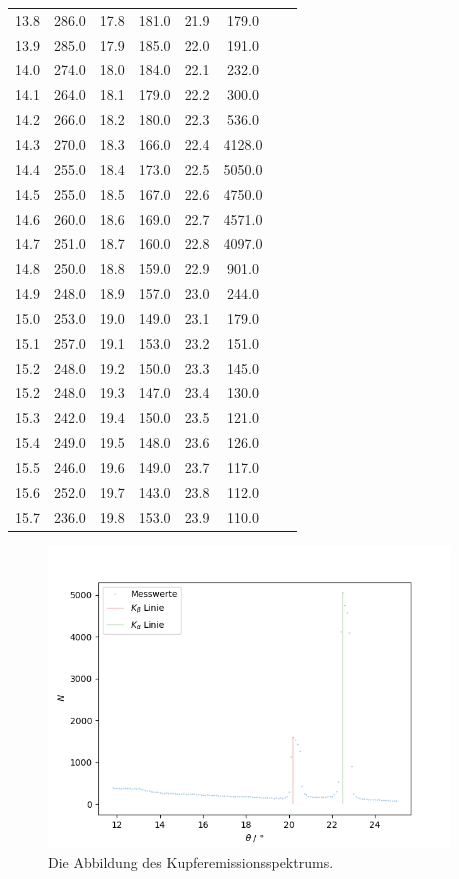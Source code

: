 \begin{table}[H]
\begin{tabular} {c  c| c  c| c  c| c  c}
        13.8 & 286.0 & 17.8 & 181.0 & 21.9 & 179.0  \\
        13.9 & 285.0 & 17.9 & 185.0 & 22.0 & 191.0  \\
        14.0 & 274.0 & 18.0 & 184.0 & 22.1 & 232.0  \\
        14.1 & 264.0 & 18.1 & 179.0 & 22.2 & 300.0  \\
        14.2 & 266.0 & 18.2 & 180.0 & 22.3 & 536.0  \\
        14.3 & 270.0 & 18.3 & 166.0 & 22.4 & 4128.0 \\
        14.4 & 255.0 & 18.4 & 173.0 & 22.5 & 5050.0 \\
        14.5 & 255.0 & 18.5 & 167.0 & 22.6 & 4750.0 \\
        14.6 & 260.0 & 18.6 & 169.0 & 22.7 & 4571.0 \\
        14.7 & 251.0 & 18.7 & 160.0 & 22.8 & 4097.0 \\
        14.8 & 250.0 & 18.8 & 159.0 & 22.9 & 901.0  \\
        14.9 & 248.0 & 18.9 & 157.0 & 23.0 & 244.0  \\
        15.0 & 253.0 & 19.0 & 149.0 & 23.1 & 179.0  \\
        15.1 & 257.0 & 19.1 & 153.0 & 23.2 & 151.0  \\
        15.2 & 248.0 & 19.2 & 150.0 & 23.3 & 145.0  \\
        15.2 & 248.0 & 19.3 & 147.0 & 23.4 & 130.0  \\
        15.3 & 242.0 & 19.4 & 150.0 & 23.5 & 121.0  \\
        15.4 & 249.0 & 19.5 & 148.0 & 23.6 & 126.0  \\
        15.5 & 246.0 & 19.6 & 149.0 & 23.7 & 117.0  \\
        15.6 & 252.0 & 19.7 & 143.0 & 23.8 & 112.0  \\
        15.7 & 236.0 & 19.8 & 153.0 & 23.9 & 110.0  \\
        \bottomrule
    \end{tabular} 
\end{table}

\begin{figure}[H] 
    \centering
    \includegraphics[height=80mm]{bilder/Kupfer.png}
    \caption{Die Abbildung des Kupferemissionsspektrums.\label{Abbildung3} }
\end{figure}

